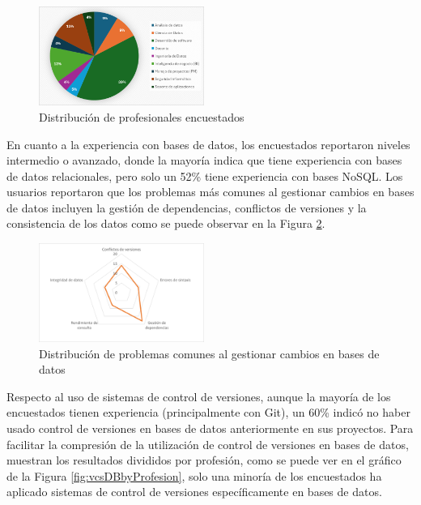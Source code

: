 \documentclass{IEEEtran}
\begin{document}
\begin{figure}[H]
    \centering
    \includegraphics[width=0.48\textwidth]{images/profesionalsDistribution.png}
    \caption{Distribución de profesionales encuestados}
    \label{fig:profesionalsDistribution}
\end{figure}

En cuanto a la experiencia con bases de datos, los encuestados reportaron niveles intermedio o avanzado, donde la mayoría indica que tiene experiencia con bases de datos relacionales, pero solo un 52\% tiene experiencia con bases NoSQL. Los usuarios reportaron que los problemas más comunes al gestionar cambios en bases de datos incluyen la gestión de dependencias, conflictos de versiones y la consistencia de los datos como se puede observar en la Figura \ref{fig:commonDBIssues}.

\begin{figure}[H]
    \centering
    \includegraphics[width=0.48\textwidth]{images/commonDBIssues.png}
    \caption{Distribución de problemas comunes al gestionar cambios en bases de datos}
    \label{fig:commonDBIssues}
\end{figure}

Respecto al uso de sistemas de control de versiones, aunque la mayoría de los encuestados tienen experiencia (principalmente con Git), un 60\% indicó no haber usado control de versiones en bases de datos anteriormente en sus proyectos. Para facilitar la compresión de la utilización de control de versiones en bases de datos, muestran los resultados divididos por profesión, como se puede ver en el gráfico de la Figura \ref{fig:vcsDBbyProfesion}, solo una minoría de los encuestados ha aplicado sistemas de control de versiones específicamente en bases de datos.
\end{document}

